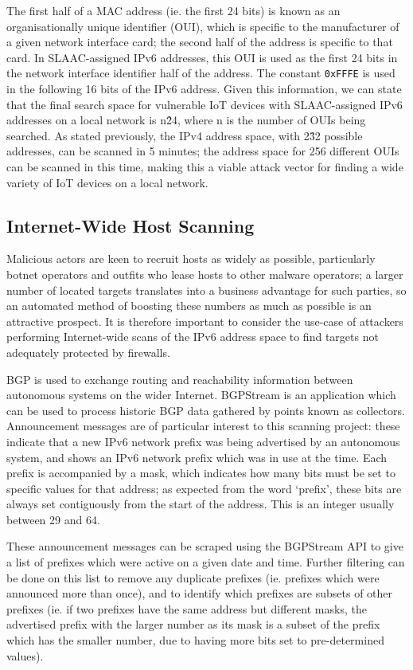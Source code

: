 \documentclass[10pt,sigconf]{acmart}
\begin{document}
The first half of a MAC address (ie. the first 24 bits) is known as an organisationally unique identifier (OUI), which is specific to the manufacturer of a given network interface card;
the second half of the address is specific to that card.
In SLAAC-assigned IPv6 addresses, this OUI is used as the first 24 bits in the network interface identifier half of the address.
The constant \texttt{0xFFFE} is used in the following 16 bits of the IPv6 address.
Given this information, we can state that the final search space for vulnerable IoT devices with SLAAC-assigned IPv6 addresses on a local network is n\^24, where n is the number of OUIs being searched.
As stated previously, the IPv4 address space, with 2\^32 possible addresses, can be scanned in 5 minutes;
the address space for 256 different OUIs can be scanned in this time, making this a viable attack vector for finding a wide variety of IoT devices on a local network.

\subsection{Internet-Wide Host Scanning}
Malicious actors are keen to recruit hosts as widely as possible, particularly botnet operators and outfits who lease hosts to other malware operators;
a larger number of located targets translates into a business advantage for such parties, so an automated method of boosting these numbers as much as possible is an attractive prospect.
It is therefore important to consider the use-case of attackers performing Internet-wide scans of the IPv6 address space to find targets not adequately protected by firewalls.

BGP is used to exchange routing and reachability information between autonomous systems on the wider Internet.
BGPStream is an application which can be used to process historic BGP data gathered by points known as collectors.
Announcement messages are of particular interest to this scanning project:
these indicate that a new IPv6 network prefix was being advertised by an autonomous system, and shows an IPv6 network prefix which was in use at the time.
Each prefix is accompanied by a mask, which indicates how many bits must be set to specific values for that address;
as expected from the word `prefix', these bits are always set contiguously from the start of the address.
This is an integer usually between 29 and 64.

These announcement messages can be scraped using the BGPStream API to give a list of prefixes which were active on a given date and time.
Further filtering can be done on this list to remove any duplicate prefixes (ie. prefixes which were announced more than once), and to identify which prefixes are subsets of other prefixes
(ie. if two prefixes have the same address but different masks, the advertised prefix with the larger number as its mask is a subset of the prefix which has the smaller number, due to having more bits set to pre-determined values).
\end{document}
